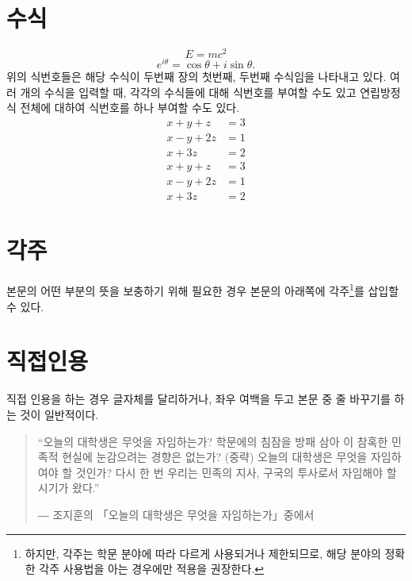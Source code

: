 \documentclass[11pt]{report}
\numberwithin{figure}{chapter}
\begin{document}
\section{수식}\label{sec:equation}

\begin{equation}
E=mc^2
\end{equation}
\begin{equation}
e^{i\theta}=\cos\theta+i\sin\theta.
\end{equation}
위의 식번호들은 해당 수식이 두번째 장의 첫번째, 두번째 수식임을 나타내고 있다. 여러 개의 수식을 입력할 때, 각각의 수식들에 대해 식번호를 부여할 수도 있고 연립방정식 전체에 대하여 식번호를 하나 부여할 수도 있다.
\begin{align}
x+y+z&=3\\
x-y+2z&=1\\
x+3z&=2
\end{align}
\begin{equation}
\begin{aligned}
x+y+z&=3\\
x-y+2z&=1\\
x+3z&=2
\end{aligned}
\end{equation}

\section{각주}\label{sec:footnotes}

본문의 어떤 부분의 뜻을 보충하기 위해 필요한 경우 본문의 아래쪽에 각주\footnote{하지만, 각주는 학문 분야에 따라 다르게 사용되거나 제한되므로, 해당 분야의 정확한 각주 사용법을 아는 경우에만 적용을 권장한다.}를 삽입할 수 있다.

\section{직접인용}\label{sec:quotation}
직접 인용을 하는 경우 글자체를 달리하거나, 좌우 여백을 두고 본문 중 줄 바꾸기를 하는 것이 일반적이다.\par
\bigskip

\begin{quote}
“오늘의 대학생은 무엇을 자임하는가? 학문에의 침잠을 방패 삼아 이 참혹한 민족적 현실에 눈감으려는 경향은 없는가? (중략) 오늘의 대학생은 무엇을 자임하여야 할 것인가? 다시 한 번 우리는 민족의 지사, 구국의 투사로서 자임해야 할 시기가 왔다.” \par
― 조지훈의  「오늘의 대학생은 무엇을 자임하는가」중에서 
\end{quote}
\bigskip
\end{document}
